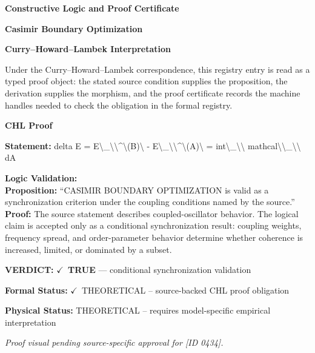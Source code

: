 \clearpage
\begingroup\tzpsupportsetup
\noindent\textbf{\fontsize{10.8pt}{12.8pt}\selectfont [ID 0434] Constructive Logic and Proof Certificate}\par
\noindent\textbf{\fontsize{10pt}{12pt}\selectfont Casimir Boundary Optimization}\par
\vspace{0.45em}
\begingroup
\footnotesize
\setlength{\parskip}{0.22em}
\setlength{\parindent}{0pt}
\noindent\textbf{Curry--Howard--Lambek Interpretation}\par
Under the Curry--Howard--Lambek correspondence, this registry entry is read as a typed proof
object: the stated source condition supplies the proposition, the derivation supplies the
morphism, and the proof certificate records the machine handles needed to check the obligation
in the formal registry.

\vspace{0.45em}
\noindent\textbf{CHL Proof}\par
\textbf{Statement:} delta E = E\textbackslash{}\_\textbackslash{}\textbackslash{}\textasciicircum{}\textbackslash{}(B)\textbackslash{} - E\textbackslash{}\_\textbackslash{}\textbackslash{}\textasciicircum{}\textbackslash{}(A)\textbackslash{} = int\textbackslash{}\_\textbackslash{}\textbackslash{} mathcal\textbackslash{}\textbackslash{}\_\textbackslash{}\textbackslash{} dA

\textbf{Logic Validation:}\\
\textbf{Proposition:} ``CASIMIR BOUNDARY OPTIMIZATION is valid as a synchronization criterion under the coupling
conditions named by the source.''\\
\textbf{Proof:} The source statement describes coupled-oscillator behavior. The logical claim is
accepted only as a conditional synchronization result: coupling weights, frequency
spread, and order-parameter behavior determine whether coherence is increased, limited,
or dominated by a subset.

\textbf{VERDICT:} \ensuremath{\checkmark}\ \textbf{TRUE} --- conditional synchronization validation

\textbf{Formal Status:} \ensuremath{\checkmark}\ THEORETICAL -- source-backed CHL proof obligation

\textbf{Physical Status:} THEORETICAL -- requires model-specific empirical interpretation
\par\vspace{0.45em}
\par
\vfill
\begingroup\footnotesize\itshape
Proof visual pending source-specific approval for [ID 0434].
\par\endgroup
\vfill
\endgroup
\endgroup
